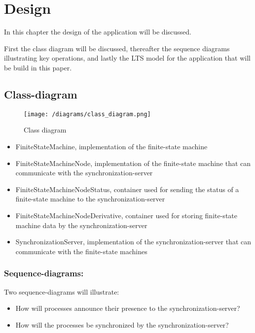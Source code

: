 \hypertarget{design}{%
\section{Design}\label{design}}

In this chapter the design of the application will be discussed.

First the class diagram will be discussed, thereafter the sequence
diagrams illustrating key operations, and lastly the LTS model for the
application that will be build in this paper.

\hypertarget{class-diagram}{%
\subsection{Class-diagram}\label{class-diagram}}

\begin{figure}
\centering
\texttt{[image: /diagrams/class\_diagram.png]}
\caption{Class diagram}
\end{figure}

\begin{itemize}
\tightlist
\item
  FiniteStateMachine, implementation of the finite-state machine
\item
  FiniteStateMachineNode, implementation of the finite-state machine
  that can communicate with the synchronization-server
\item
  FiniteStateMachineNodeStatus, container used for sending the status of
  a finite-state machine to the synchronization-server
\item
  FiniteStateMachineNodeDerivative, container used for storing
  finite-state machine data by the synchronization-server
\item
  SynchronizationServer, implementation of the synchronization-server
  that can communicate with the finite-state machines
\end{itemize}

\hypertarget{sequence-diagrams}{%
\subsubsection{Sequence-diagrams:}\label{sequence-diagrams}}

Two sequence-diagrams will illustrate:

\begin{itemize}
\tightlist
\item
  How will processes announce their presence to the
  synchronization-server?
\item
  How will the processes be synchronized by the synchronization-server?
\end{itemize}

